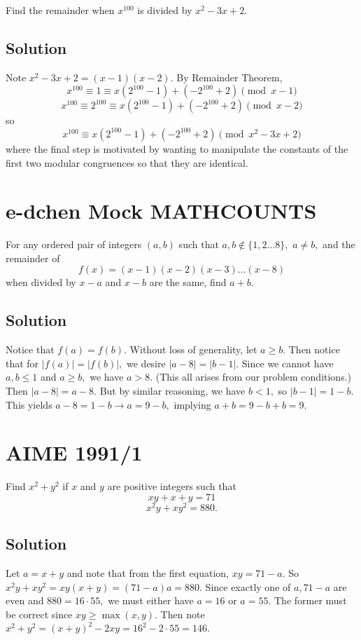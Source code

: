 \documentclass[mast]{lucky}
\begin{document}
Find the remainder when $x^{100}$ is divided by $x^2-3x+2.$

\subsection{Solution}

Note $x^2-3x+2=(x-1)(x-2).$ By Remainder Theorem, \[x^{100}\equiv 1\equiv x(2^{100}-1)+(-2^{100}+2)\pmod{x-1}\]
\[x^{100}\equiv 2^{100}\equiv x(2^{100}-1)+(-2^{100}+2)\pmod{x-2}\]
so
\[x^{100}\equiv x(2^{100}-1)+(-2^{100}+2)\pmod{x^2-3x+2}\]
where the final step is motivated by wanting to manipulate the constants of the first two modular congruences so that they are identical.

\pagebreak\section{e-dchen Mock MATHCOUNTS}

For any ordered pair of integers $(a,b)$ such that $a,b\not\in \{1,2\dots 8\},$ $a\neq b,$ and the remainder of $$f(x)=(x-1)(x-2)(x-3)\dots(x-8)$$ when divided by $x-a$ and $x-b$ are the same, find $a+b.$

\subsection{Solution}

Notice that $f(a)=f(b).$ Without loss of generality, let $a\geq b.$ Then notice that for $|f(a)|=|f(b)|,$ we desire $|a-8|=|b-1|.$ Since we cannot have $a,b\leq 1$ and $a\geq b,$ we have $a>8.$ (This all arises from our problem conditions.) Then $|a-8|=a-8.$ But by similar reasoning, we have $b<1,$ so $|b-1|=1-b.$ This yields $a-8=1-b\to a=9-b,$ implying $a+b=9-b+b=9.$

\pagebreak\section{AIME 1991/1}

Find $x^2+y^2$ if $x$ and $y$ are positive integers such that
\[xy+x+y = 71\]
\[x^2y+xy^2 = 880.\]

\subsection{Solution}

Let $a=x+y$ and note that from the first equation, $xy=71-a.$ So $x^2y+xy^2=xy(x+y)=(71-a)a=880.$ Since exactly one of $a,71-a$ are even and $880=16\cdot 55,$ we must either have $a=16$ or $a=55.$ The former must be correct since $xy\geq \max(x,y).$ Then note $x^2+y^2=(x+y)^2-2xy=16^2-2\cdot 55=146.$
\end{document}
